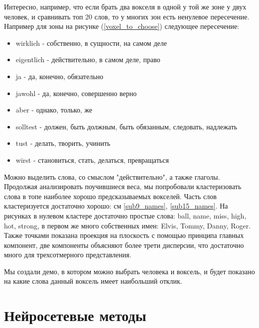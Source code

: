\documentclass[pdftex,ptm,12pt,a4paper]{report}
\theoremstyle{definition}
\begin{document}
Интересно, например, что если брать два вокселя в одной у той же зоне у двух человек, и сравнивать топ 20 слов, то у многих зон есть ненулевое пересечение. Например для зоны на рисунке (\ref{voxel_to_choose}) следующее  пересечение:

\begin{itemize}
\item wirklich - собственно, в сущности, на самом деле
\item eigentlich - действительно, в самом деле, право
\item ja - да, конечно, обязательно
\item jawohl -  да, конечно, совершенно верно
\item aber - однако, только, же
\item solltest - должен, быть должным, быть обязанным, следовать, надлежать
\item tust - делать, творить, учинить
\item wirst - становиться, стать, делаться, превращаться
\end{itemize}

Можно выделить слова, со смыслом "действительно", а также глаголы. Продолжая анализировать поучившиеся веса, мы попробовали кластеризовать слова в топе наиболее хорошо предсказываемых вокселей. Часть слов кластеризуется достаточно хорошо: см \ref{sub9_names}, \ref{sub15_names}. На рисунках в нулевом кластере достаточно простые слова: ball, name, miss, high, hot, strong, в первом же много собственных имен: Elvis, Tommy, Danny, Roger. Также точками показана проекция на плоскость с помощью принципа главных компонент, две компоненты объясняют более трети дисперсии, что достаточно много для трехсотмерного представления.

Мы создали демо, в котором можно выбрать человека и воксель, и будет показано на какие слова данный воксель имеет наибольший отклик.

\section{Нейросетевые методы}
\end{document}
